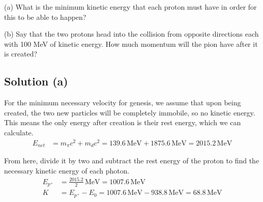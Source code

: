 \documentclass[12pt]{report}
\begin{document}
    (a) What is the minimum kinetic energy that each proton must have in order for this to be able to happen? %

    (b) Say that the two protons head into the collision from opposite directions each with 100 MeV of kinetic energy. 
    How much momentum will the pion have after it is created?

    \subsection*{Solution (a)}
        For the minimum necessary velocity for genesis, we assume that upon being created, the two new particles will be completely immobile, so no kinetic energy.
        This means the only energy after creation is their rest energy, which we can calculate.
        \begin{align*}
            E_{net} &=  m_\pi c^2 + m_d c^2
                =   139.6\,\unit{\mega\eV} + 1875.6\,\unit{\mega\eV}
                =   2015.2\,\unit{\mega\eV}
        \end{align*}

        From here, divide it by two and subtract the rest energy of the proton to find the necessary kinetic energy of each photon.
        \begin{align*}
            E_{p^+} &=  \frac{2015.2}{2}\,\unit{\mega\eV}
                =   1007.6\,\unit{\mega\eV}\\
            K   &=  E_{p^+} - E_0
                =   1007.6\,\unit{\mega\eV} - 938.8\,\unit{\mega\eV}
                =   \boxed{68.8\,\unit{\mega\eV}}
        \end{align*}

\end{document}
